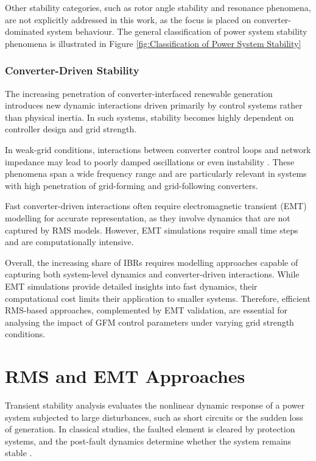 Other stability categories, such as rotor angle stability and resonance phenomena, are not explicitly addressed in this work, as the focus is placed on converter-dominated system behaviour. The general classification of power system stability phenomena is illustrated in Figure \ref{fig:Classification of Power System Stability}

\subsubsection{Converter-Driven Stability}

The increasing penetration of converter-interfaced renewable generation introduces new dynamic interactions driven primarily by control systems rather than physical inertia. In such systems, stability becomes highly dependent on controller design and grid strength.\cite{10497578}

In weak-grid conditions, interactions between converter control loops and network impedance may lead to poorly damped oscillations or even instability \cite{en14144290}. These phenomena span a wide frequency range and are particularly relevant in systems with high penetration of grid-forming and grid-following converters.

Fast converter-driven interactions often require electromagnetic transient (EMT) modelling for accurate representation, as they involve dynamics that are not captured by RMS models. However, EMT simulations require small time steps and are computationally intensive.\cite{en14144290}

Overall, the increasing share of IBRs requires modelling approaches capable of capturing both system-level dynamics and converter-driven interactions. While EMT simulations provide detailed insights into fast dynamics, their computational cost limits their application to smaller systems. Therefore, efficient RMS-based approaches, complemented by EMT validation, are essential for analysing the impact of GFM control parameters under varying grid strength conditions.


\section{RMS and EMT Approaches}

Transient stability analysis evaluates the nonlinear dynamic response of a power system subjected to large disturbances, such as short circuits or the sudden loss of generation. In classical studies, the faulted element is cleared by protection systems, and the post-fault dynamics determine whether the system remains stable \cite{kundur1994}.

